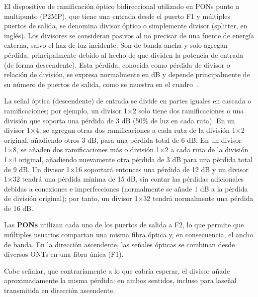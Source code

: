 El dispositivo de ramificación óptico bidireccional utilizado en PONs punto a multipunto (P2MP), que tiene una entrada desde el puerto F1 y múltiples puertos de salida, se denomina divisor óptico o simplemente divisor (splitter, en inglés). Los divisores se consideran pasivos al no precisar de una fuente de energía externa, salvo el haz de luz incidente. Son de banda ancha y solo agregan pérdida, principalmente debido al hecho de que dividen la potencia de entrada (de forma descendente). Esta pérdida, conocida como pérdida de divisor o relación de división, se expresa normalmente en dB y depende principalmente de su número de puertos de salida, como se muestra en el cuadro~.

La señal óptica (descendente) de entrada se divide en partes iguales en cascada o ramificaciones; por ejemplo, un divisor 1×2 solo tiene dos ramificaciones o una división que soporta una pérdida de 3 dB (50\% de luz en cada ruta). En un divisor 1×4, se agregan otras dos ramificaciones a cada ruta de la división 1×2 original, añadiendo otros 3 dB, para una pérdida total de 6 dB. En un divisor 1×8, se añaden dos ramificaciones más o división 1×2 a cada ruta de la división 1×4 original, añadiendo nuevamente otra pérdida de 3 dB para una pérdida total de 9 dB. Un divisor 1×16 soportará entonces una pérdida de 12 dB y un divisor 1×32 tendrá una pérdida mínima de 15 dB, sin contar las pérdidas adicionales debidas a conexiones e imperfecciones (normalmente se añade 1 dB a la pérdida de división original); por tanto, un divisor 1×32 tendrá normalmente una pérdida de 16 dB.

Las \textbf{PONs} utilizan cada uno de los puertos de salida a F2, lo que permite que múltiples usuarios compartan una misma fibra óptica y, en consecuencia, el ancho de banda. En la dirección ascendente, las señales ópticas se combinan desde diversos ONTs en una fibra única (F1).

Cabe señalar, que contrariamente a lo que cabría esperar, el divisor añade aproximadamente la misma pérdida; en ambos sentidos, incluso para laseñal transmitida en dirección ascendente.


